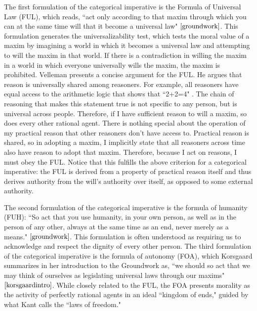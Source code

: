 \begin{isabellebody}
\begin{isamarkuptext}
The first formulation of the categorical imperative is the
Formula of Universal Law (FUL), which reads, ``act only according to that maxim through which you can 
at the same time will that it become a universal law" $\cite[34]{groundwork}$. This formulation
generates the universalizability test, which tests the moral value of a maxim by 
imagining a world in which it becomes a universal law and attempting to will the maxim in that world.
If there is a contradiction in willing the maxim in a world in which everyone universally wills the maxim,
the maxim is prohibited. 
Velleman presents a concise argument for the FUL. He argues that reason is universally shared among reasoners. For 
example, all reasoners have equal access to the arithmetic logic that shows that ``2+2=4" \cite[29]{velleman}. The chain of 
reasoning that makes this statement true is not specific to any person, but is universal across people. 
Therefore, if I have sufficient reason to will a maxim, so does every other rational agent. There is 
nothing special about the operation of my practical reason that other reasoners don't have access to. 
Practical reason is shared, so in adopting a maxim, I implicitly state that all reasoners
across time also have reason to adopt that maxim. Therefore, because I act on reasons, I must obey the 
FUL. Notice that this fulfills the above criterion for a categorical imperative: the FUL is derived from 
a property of practical reason itself and thus derives authority from the will's authority over itself, 
as opposed to some external authority.

The second formulation of the categorical imperative is the formula of humanity (FUH): ``So act that you use humanity, 
in your own person, as well as in the person of any other, always at the same time as an end, never merely 
as a means." $\cite[41]{groundwork}$. This formulation is often understood as requiring us to 
acknowledge and respect the dignity of every other person. The third formulation of the categorical 
imperative is the formula of autonomy (FOA), which Korsgaard summarizes in her introduction to the Groundwork 
as, ``we should so act that we may think of ourselves as legislating universal laws through our 
maxims" $\cite[28]{korsgaardintro}$. While closely related to the FUL, the FOA presents morality as the activity of 
perfectly rational agents in an ideal ``kingdom of ends," guided by what Kant calls the ``laws of freedom."


\end{isamarkuptext}
\end{isabellebody}
